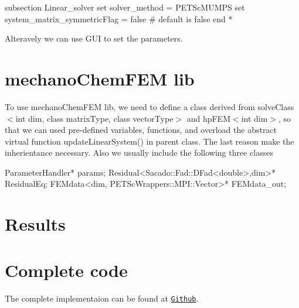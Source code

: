\begin{DoxyCode}
subsection Linear\_solver
        set solver\_method = PETScMUMPS
        set system\_matrix\_symmetricFlag = \textcolor{keyword}{false} # \textcolor{keywordflow}{default} is \textcolor{keyword}{false}
end
*
\end{DoxyCode}
 Alteravely we can use G\-U\-I to set the parameters. \hypertarget{_intercalation_lib}{}\section{mechano\-Chem\-F\-E\-M lib}\label{_intercalation_lib}
To use mechano\-Chem\-F\-E\-M lib, we need to define a class derived from {\ttfamily solve\-Class$<$int dim, class matrix\-Type, class vector\-Type$>$} and {\ttfamily hp\-F\-E\-M$<$int dim$>$}, so that we can used pre-\/defined variables, functions, and overload the abstract virtual function {\ttfamily update\-Linear\-System()} in parent class. The last reason make the inherientance necessary. Also we usually include the following three classes 
\begin{DoxyCode}
ParameterHandler* params;   
Residual<Sacado::Fad::DFad<double>,dim>* ResidualEq;
FEMdata<dim, PETScWrappers::MPI::Vector>* FEMdata\_out;
\end{DoxyCode}
 \hypertarget{_intercalation_results}{}\section{Results}\label{_intercalation_results}
    \hypertarget{_intercalation_com}{}\section{Complete code}\label{_intercalation_com}
The complete implementaion can be found at \href{https://github.com/mechanoChem/mechanoChemFEM/tree/example/Example1%20Intercalation}{\tt Github}. 